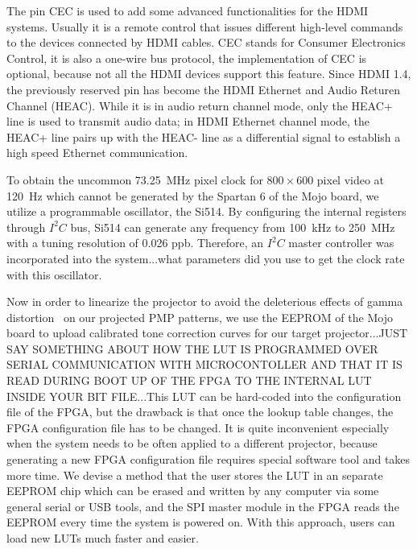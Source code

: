 \documentclass[]{spie}  %
\begin{document}
The pin CEC is used to add some advanced functionalities for the HDMI systems. Usually it is a remote control that issues different high-level commands to the devices connected by HDMI cables. CEC stands for Consumer Electronics Control, it is also a one-wire bus protocol, the implementation of CEC is optional, because not all the HDMI devices support this feature. Since HDMI 1.4, the previously reserved pin has become the HDMI Ethernet and Audio Returen Channel (HEAC). While it is in audio return channel mode, only the HEAC+ line is used to transmit audio data; in HDMI Ethernet channel mode, the HEAC+ line pairs up with the HEAC- line as a differential signal to establish a high speed Ethernet communication.

To obtain the uncommon 73.25~MHz pixel clock for $800\times 600$ pixel video at 120~Hz which cannot be generated by the Spartan 6 of the Mojo board, we utilize a programmable oscillator, the Si514. By configuring the internal registers through $I^2C$ bus, Si514 can generate any frequency from 100~kHz to 250~MHz with a tuning resolution of 0.026 ppb. Therefore, an $I^2C$ master controller was incorporated into the system...what parameters did you use to get the clock rate with this oscillator. 

Now in order to linearize the projector to avoid the deleterious effects of gamma distortion~\cite{gamm10} on our projected PMP patterns, we use the EEPROM of the Mojo board to upload calibrated tone correction curves for our target projector...JUST SAY SOMETHING ABOUT HOW THE LUT IS PROGRAMMED OVER SERIAL COMMUNICATION WITH MICROCONTOLLER AND THAT IT IS READ DURING BOOT UP OF THE FPGA TO THE INTERNAL LUT INSIDE YOUR BIT FILE...This LUT can be hard-coded into the configuration file of the FPGA, but the drawback is that once the lookup table changes, the FPGA configuration file has to be changed. It is quite inconvenient especially when the system needs to be often applied to a different projector, because generating a new FPGA configuration file requires special software tool and takes more time. We devise a method that the user stores the LUT in an separate EEPROM chip which can be erased and written by any computer via some general serial or USB tools, and the SPI master module in the FPGA reads the EEPROM every time the system  is powered on. With this approach, users can load new LUTs much faster and easier.
\end{document}
